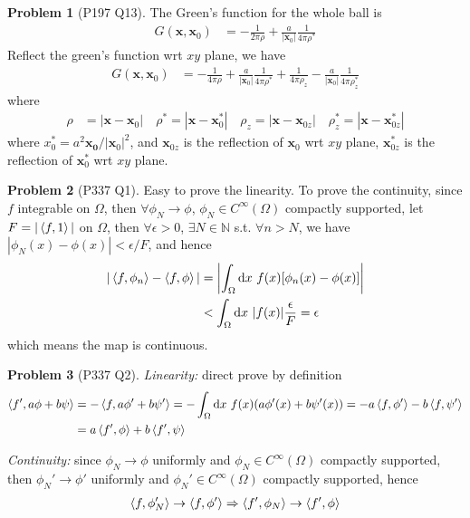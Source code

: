 \documentclass[twoside,11pt]{article}
\newcommand{\N}{\mathbb{N}}
\renewcommand*\d{\mathop{}\!\mathrm{d}}
\theoremstyle{definition}
\newtheorem{problem}{Problem}
\theoremstyle{remark}
\begin{document}
\begin{problem}[P197 Q13]
The Green's function for the whole ball is
\begin{align*}
    G(\mathbf{x}, \mathbf{x}_0) &= -\frac{1}{2\pi\rho}
    + \frac{a}{|\mathbf{x}_0|}\frac{1}{4\pi\rho^*}
\end{align*}
Reflect the green's function wrt $xy$ plane, we have
\begin{align*}
    G(\mathbf{x}, \mathbf{x}_0) &= 
    -\frac{1}{4\pi\rho} + \frac{a}{|\mathbf{x}_0|}\frac{1}{4\pi\rho^*}
    +\frac{1}{4\pi\rho_z} - \frac{a}{|\mathbf{x}_0|}\frac{1}{4\pi\rho^*_z}
\end{align*}
where
\begin{align*}
    \rho &= |\mathbf{x}-\mathbf{x}_0|\quad
    \rho^* = |\mathbf{x}-\mathbf{x}_0^*|\quad
    \rho_z = |\mathbf{x}-\mathbf{x}_{0z}|\quad
    \rho_z^* = |\mathbf{x}-\mathbf{x}_{0z}^*|
\end{align*}
where $x_0^*=a^2\mathbf{x_0}/|\mathbf{x}_0|^2$,
and $\mathbf{x}_{0z}$ is the reflection of $\mathbf{x}_0$ wrt $xy$ plane,
$\mathbf{x}^*_{0z}$ is the reflection of $\mathbf{x}_0^*$ wrt $xy$ plane.

\end{problem}


\begin{problem}[P337 Q1]
Easy to prove the linearity.
To prove the continuity, since $f$ integrable on $\Omega$,
then $\forall\phi_N\rightarrow\phi$, $\phi_N\in C^\infty(\Omega)$
compactly supported, let $F=|\braket{f, 1}|$ on $\Omega$, then
$\forall \epsilon>0$, $\exists N\in\N$ s.t. $\forall n>N$,
we have $|\phi_N(x)-\phi(x)|<\epsilon/F$, and hence
\begin{align*}
    |\braket{f,\phi_n}-\braket{f,\phi}|
    &=\left|
        \int_\Omega\d x\ f(x)[\phi_n(x)-\phi(x)]
    \right|\\
    &<\int_\Omega\d x\ |f(x)|\frac{\epsilon}{F}=\epsilon
\end{align*}
which means the map is continuous.

\end{problem}


\begin{problem}[P337 Q2]
\textit{Linearity:} direct prove by definition
\begin{align*}
    \braket{f',a\phi + b\psi} 
    &=
    -\braket{f,a\phi'+b\psi'}
    =-\int_\Omega\d x\ f(x)(a\phi'(x)+b\psi'(x))
    = -a\braket{f,\phi'} - b\braket{f,\psi'}\\
    &= a\braket{f',\phi} + b\braket{f',\psi}
\end{align*}

\textit{Continuity:} since $\phi_N\rightarrow\phi$ uniformly 
and $\phi_N\in C^\infty(\Omega)$ compactly supported,
then $\phi_N'\rightarrow\phi'$ uniformly and
$\phi_N'\in C^\infty(\Omega)$ compactly supported,
hence
\begin{align*}
    \braket{f,\phi_N'}\rightarrow
    \braket{f,\phi'}
    \Rightarrow
    \braket{f',\phi_N}\rightarrow
    \braket{f',\phi}
\end{align*}

\end{problem}
\end{document}
